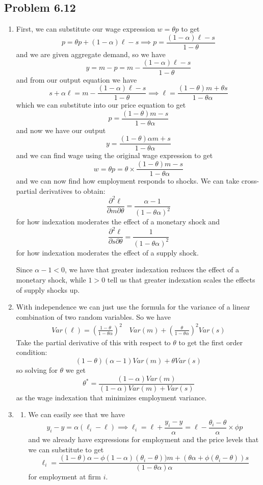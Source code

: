 \documentclass[11pt]{amsart}
\begin{document}
\subsection{Problem 6.12}
\begin{enumerate}[label = (\alph*)]
	\item First, we can substitute our wage expression $w = \theta p$ to get
	\[
	p = \theta p + (1-\alpha) \ell - s \implies p = \frac{(1-\alpha) \ell - s}{1-\theta}
	\]
	and we are given aggregate demand, so we have
	\[
	y = m - p = m - \frac{(1-\alpha) \ell - s}{1-\theta}
	\]
	and from our output equation we have
	\[
	s + \alpha \ell = m - \frac{(1-\alpha) \ell - s}{1-\theta} \implies \ell = \frac{(1-\theta) m + \theta s}{1-\theta \alpha}
	\]
	which we can substitute into our price equation to get
	\[
	p = \frac{(1-\theta) m - s}{1-\theta \alpha}
	\]
	and now we have our output
	\[
	y = \frac{(1-\theta) \alpha m + s}{1-\theta \alpha}
	\]
	and we can find wage using the original wage expression to get
	\[
	w = \theta p = \theta \times \frac{(1-\theta) m - s}{1-\theta \alpha}
	\]
	and we can now find how employment responds to shocks. We can take cross-partial derivatives to obtain:
	\[
	\frac{\partial^2 \ell}{\partial m \partial \theta} = \frac{\alpha - 1}{(1-\theta \alpha)^2}
	\]
	for how indexation moderates the effect of a monetary shock and
	\[
	\frac{\partial^2 \ell}{\partial s \partial \theta} = \frac{1}{(1-\theta \alpha)^2}
	\]
	for how indexation moderates the effect of a supply shock.
	
	Since $\alpha - 1 < 0$, we have that greater indexation reduces the effect of a monetary shock, while $1 > 0$ tell us that greater indexation scales the effects of supply shocks up.
	
	\item With independence we can just use the formula for the variance of a linear combination of two random variables. So we have
	\begin{align*}
	Var(\ell) = \left(\frac{1-\theta}{1-\theta \alpha}\right)^2  \quad Var(m) + \left(\frac{\theta}{1-\theta \alpha}\right)^2 Var(s)
	\end{align*}
	Take the partial derivative of this with respect to $\theta$ to get the first order condition: 
	\[
	(1-\theta)(\alpha-1) Var(m) + \theta Var(s)
	\]
	so solving for $\theta$ we get
	\[
	\theta^* = \frac{(1-\alpha) Var(m)}{(1-\alpha) Var(m) + Var(s)}
	\]
	as the wage indexation that minimizes employment variance.
	
	\item \begin{enumerate}[label = (\roman*)]
		\item We can easily see that we have
		\[
		y_i - y = \alpha (\ell_i - \ell) \implies \ell_i = \ell + \frac{y_i - y}{\alpha} = \ell - \frac{\theta_i - \theta}{\alpha} \times \phi p
		\]
		and we already have expressions for employment and the price levels that we can substitute to get
		\[
		\ell_i = \frac{(1-\theta) \alpha - \phi (1-\alpha) (\theta_i - \theta)) m + (\theta \alpha + \phi (\theta_i - \theta)) s}{(1-\theta \alpha) \alpha}
		\]
		for employment at firm $i$.
		

\end{enumerate}
\end{enumerate}
\end{document}
